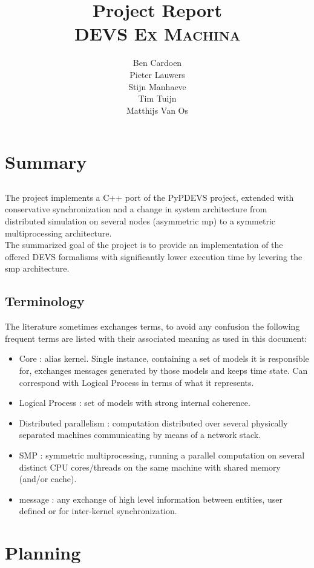 \documentclass[8pt,a4paper]{report}
\title{Project Report\\\textsc{DEVS Ex Machina}}
\author{Ben Cardoen\\Pieter Lauwers\\Stijn Manhaeve\\Tim Tuijn\\Matthijs Van Os}
\date{}
\begin{document}
\maketitle
\tableofcontents{}

%
\chapter{Summary}
%
\section*{}
The project implements a C++ port of the PyPDEVS project, extended with conservative synchronization and a change in system architecture from distributed simulation on several nodes (asymmetric mp) to a symmetric multiprocessing architecture. \\The summarized goal of the project is to provide an implementation of the offered DEVS formalisms with significantly lower execution time by levering the smp architecture.

\section*{Terminology}
The literature sometimes exchanges terms, to avoid any confusion the following frequent terms are listed with their associated meaning as used in this document:
\begin{itemize}
  \item Core : alias kernel. Single instance, containing a set of models it is responsible for, exchanges messages generated by those models and keeps time state. Can correspond with Logical Process in terms of what it represents.
  \item Logical Process : set of models with strong internal coherence.
  \item Distributed parallelism : computation distributed over several physically separated machines communicating by means of a network stack.
  \item SMP : symmetric multiprocessing, running a parallel computation on several distinct CPU cores/threads on the same machine with shared memory (and/or cache).
  \item message : any exchange of high level information between entities, user defined or for inter-kernel synchronization.
\end{itemize}

\chapter{Planning}
\end{document}

